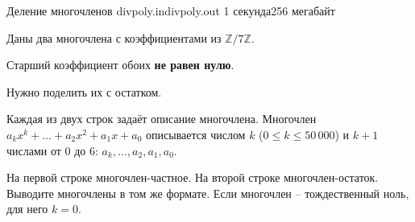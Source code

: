 
\begin{problem}{Деление многочленов}
{divpoly.in}{divpoly.out}
{1 секунда}{256 мегабайт}{}

Даны два многочлена с коэффициентами из $\mathbb{Z}/7\mathbb{Z}$.

Старший коэффициент обоих {\bf не равен нулю}.

Нужно поделить их с остатком.

\InputFile

Каждая из двух строк задаёт описание многочлена.
Многочлен $a_kx^k + \dots + a_2x^2 + a_1x + a_0$ описывается числом $k$ ($0 \le k \le 50\,000$) и $k+1$ числами от $0$ до $6$:
$a_k, \dots, a_2, a_1, a_0$.

\OutputFile

На первой строке многочлен-частное. 
На второй строке многочлен-остаток.
Выводите многочлены в том же формате. 
Если многочлен -- тождественный ноль, для него $k = 0$.

\Examples

\begin{example}
%
%
%
\end{example}

\end{problem}
